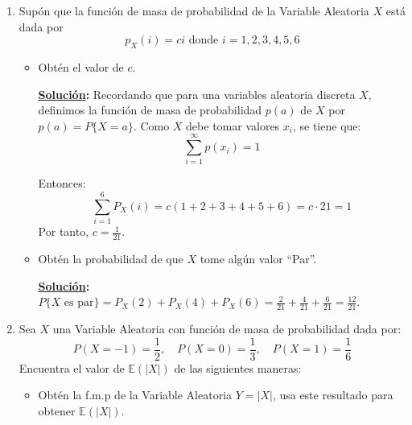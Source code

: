 \documentclass[11pt,letterpaper]{report}
\newcommand{\sol}{\textbf{\underline{Solución}: }} %
\begin{document}
\begin{enumerate}
\begin{itemize}
    \item Calcula $P(\frac{1}{2} < X < \frac{3}{2})$
    
    \sol Recordando que\footnote{Propiedad de un evento en términos de $F(x)$, página 140
    \emph{Introducción a la probabilidad}, Luis Rincón, 2016.}:
    $$P(a < x < b) = P(x < b) - P(x \leq a) = F(b_-) - F(a)$$

    \begin{align*}
        P(\frac{1}{2} < X < \frac{3}{2})
            &= P(x < \frac{3}{2}) - P(x \leq \frac{1}{2})\\
            &= \lim_{n \to \infty}F(\frac{1}{2} + \frac{\frac{3}{2}-1}{4}) - \frac{\frac{1}{2}}{4}\\
            &= \frac{1}{2}
    \end{align*}
\end{itemize}

\item Supón que la función de masa de probabilidad de la Variable Aleatoria $X$ está dada por
\[
    p_X(i) = ci \text{ donde } i = 1,2,3,4,5,6
\]
\begin{itemize}
    \item Obtén el valor de $c$.
    
    \sol Recordando que para una variables aleatoria discreta $X$, definimos la función de masa de
    probabilidad $p(a)$ de $X$ por $p(a) = P\{ X=a \}$. Como $X$ debe tomar valores $x_i$, se tiene que:
    $$\sum_{i=1}^{\infty}p(x_i) = 1$$

    Entonces:
    \[
        \sum_{i=1}^{6} P_X(i) = c(1+2+3+4+5+6) = c\cdot21 = 1
    \]
    Por tanto, $c=\frac{1}{21}$.
    
    \item Obtén la probabilidad de que $X$ tome algún valor ``Par''.
    
    \sol $P\{ X \text{ es par} \} = P_X(2) + P_X(4) + P_X(6) =
        \frac{2}{21} + \frac{4}{21} + \frac{6}{21} = \frac{12}{21}$.
\end{itemize}

\item Sea $X$ una Variable Aleatoria con función de masa de probabilidad dada por:
\[
    P(X=-1)= \frac{1}{2},\quad P(X=0)=\frac{1}{3},\quad P(X=1)=\frac{1}{6}
    \]
    Encuentra el valor de $\mathds{E}(|X|)$ de las siguientes maneras:
    \begin{itemize}
        \item Obtén la f.m.p de la Variable Aleatoria $Y = |X|$, usa este resultado para
        obtener $\mathds{E}(|X|)$.
        

\end{itemize}
\end{enumerate}
\end{document}
